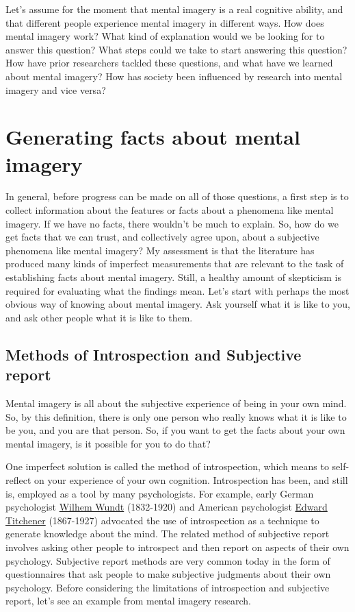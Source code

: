 \documentclass[
  oneside,
  12pt]{crumpbook}
\begin{document}
Let's assume for the moment that mental imagery is a real cognitive ability, and that different people experience mental imagery in different ways. How does mental imagery work? What kind of explanation would we be looking for to answer this question? What steps could we take to start answering this question? How have prior researchers tackled these questions, and what have we learned about mental imagery? How has society been influenced by research into mental imagery and vice versa?

\hypertarget{generating-facts-about-mental-imagery}{%
\section{Generating facts about mental imagery}\label{generating-facts-about-mental-imagery}}

In general, before progress can be made on all of those questions, a first step is to collect information about the features or facts about a phenomena like mental imagery. If we have no facts, there wouldn't be much to explain. So, how do we get facts that we can trust, and collectively agree upon, about a subjective phenomena like mental imagery? My assessment is that the literature has produced many kinds of imperfect measurements that are relevant to the task of establishing facts about mental imagery. Still, a healthy amount of skepticism is required for evaluating what the findings mean. Let's start with perhaps the most obvious way of knowing about mental imagery. Ask yourself what it is like to you, and ask other people what it is like to them.

\hypertarget{methods-of-introspection-and-subjective-report}{%
\subsection{Methods of Introspection and Subjective report}\label{methods-of-introspection-and-subjective-report}}

Mental imagery is all about the subjective experience of being in your own mind. So, by this definition, there is only one person who really knows what it is like to be you, and you are that person. So, if you want to get the facts about your own mental imagery, is it possible for you to do that?

One imperfect solution is called the method of introspection, which means to self-reflect on your experience of your own cognition. Introspection has been, and still is, employed as a tool by many psychologists. For example, early German psychologist \href{https://en.wikipedia.org/wiki/Wilhelm_Wundt}{Wilhem Wundt} (1832-1920) and American psychologist \href{https://en.wikipedia.org/wiki/Edward_B._Titchener}{Edward Titchener} (1867-1927) advocated the use of introspection as a technique to generate knowledge about the mind. The related method of subjective report involves asking other people to introspect and then report on aspects of their own psychology. Subjective report methods are very common today in the form of questionnaires that ask people to make subjective judgments about their own psychology. Before considering the limitations of introspection and subjective report, let's see an example from mental imagery research.
\end{document}
